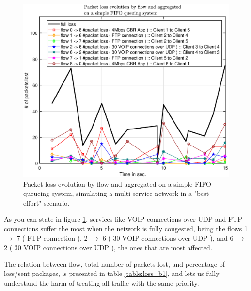 \documentclass[conference,compsoc]{IEEEtran}
\begin{document}
     \begin{figure}[H]
     \centering
     \includegraphics[width=1\columnwidth]{EPS/B/loss_b1.eps}
     \caption{Packet loss evolution by flow and aggregated on a simple FIFO queueing system, simulating a multi-service network in a "best effort" scenario.}
     \label{graph:loss_b11}
     \end{figure}

     As you can state in figure \ref{graph:loss_b11}, services like VOIP connections over UDP and FTP connections suffer the most when the network is fully congested, being the flows 1 $ \rightarrow $ 7 ( FTP connection ), 2 $ \rightarrow $ 6 ( 30 VOIP connections over UDP ),  and  6 $ \rightarrow $ 2 ( 30 VOIP connections over UDP ), the ones that are most affected. \par 
     The relation between flow, total number of packets lost, and percentage of loss/sent packages, is presented in table \ref{table:loss_b1}, and lets us fully understand the harm of treating all traffic with the same priority.\par 
\end{document}
